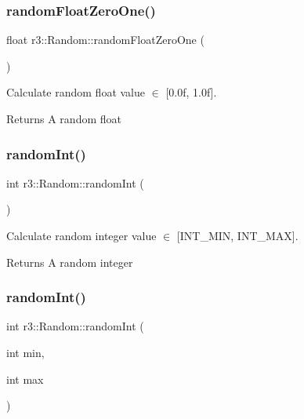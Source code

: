 \subsubsection{\texorpdfstring{random\+Float\+Zero\+One()}{randomFloatZeroOne()}}
{\footnotesize\ttfamily float r3\+::\+Random\+::random\+Float\+Zero\+One (\begin{DoxyParamCaption}{ }\end{DoxyParamCaption})\hspace{0.3cm}{\ttfamily [static]}}



Calculate random float value $\in$ \mbox{[}0.\+0f, 1.\+0f\mbox{]}. 

\begin{DoxyReturn}{Returns}
A random float 
\end{DoxyReturn}
\mbox{\label{classr3_1_1_random_a72b76209864f485f539b6edccc434d9e}} 
\subsubsection{\texorpdfstring{random\+Int()}{randomInt()}\hspace{0.1cm}{\footnotesize\ttfamily [1/2]}}
{\footnotesize\ttfamily int r3\+::\+Random\+::random\+Int (\begin{DoxyParamCaption}{ }\end{DoxyParamCaption})\hspace{0.3cm}{\ttfamily [static]}}



Calculate random integer value $\in$ \mbox{[}I\+N\+T\+\_\+\+M\+IN, I\+N\+T\+\_\+\+M\+AX\mbox{]}. 

\begin{DoxyReturn}{Returns}
A random integer 
\end{DoxyReturn}
\mbox{\label{classr3_1_1_random_af98cf3295385b16f0369addeed024ce0}} 
\subsubsection{\texorpdfstring{random\+Int()}{randomInt()}\hspace{0.1cm}{\footnotesize\ttfamily [2/2]}}
{\footnotesize\ttfamily int r3\+::\+Random\+::random\+Int (\begin{DoxyParamCaption}\item[{int}]{min,  }\item[{int}]{max }\end{DoxyParamCaption})\hspace{0.3cm}{\ttfamily [static]}}



